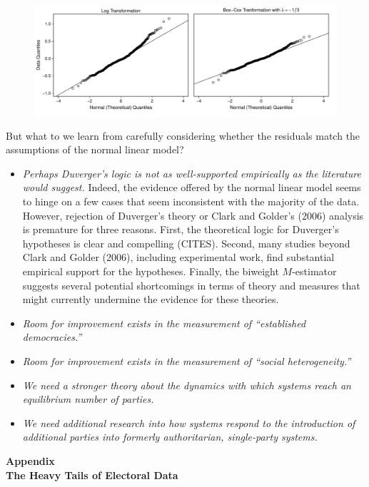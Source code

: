 \documentclass[10pt]{article}
\begin{document}
\begin{figure}[h!]
\begin{center}
\includegraphics[width = \textwidth]{figs/cg-trans-qq-plot.pdf}
\caption{}\label{fig:cg-trans-qq-plot}
\end{center}
\end{figure}



But what to we learn from carefully considering whether the residuals match the assumptions of the normal linear model?
\begin{itemize}
\item \textit{Perhaps Duverger's logic is not as well-supported empirically as the literature would suggest.} Indeed, the evidence offered by the normal linear model seems to hinge on a few cases that seem inconsistent with the majority of the data. However, rejection of Duverger's theory or Clark and Golder's (2006) analysis is premature for three reasons. First, the theoretical logic for Duverger's hypotheses is clear and compelling (CITES). Second, many studies beyond Clark and Golder (2006), including experimental work, find substantial empirical support for the hypotheses. Finally, the biweight $M$-estimator suggests several potential shortcomings in terms of theory and measures that might currently undermine the evidence for these theories.
\item \textit{Room for improvement exists in the measurement of ``established democracies.''}
\item \textit{Room for improvement exists in the measurement of ``social heterogeneity.''}
\item \textit{We need a stronger theory about the dynamics with which systems reach an equilibrium number of parties.}
\item \textit{We need additional research into how systems respond to the introduction of additional parties into formerly authoritarian, single-party systems.}
\end{itemize}

\singlespace

%



\newpage
\doublespace
\begin{appendix}
\begin{center}
\textbf{{\LARGE Appendix}}\\\vspace{2mm}
\textbf{{\large The Heavy Tails of Electoral Data}}\\\vspace{2mm}

\end{center}
\section{}


\end{appendix}
\end{document}
